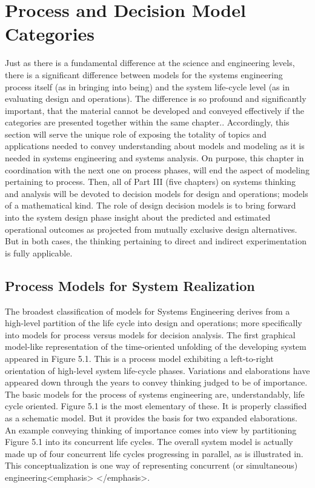 
\section{Process and Decision Model Categories}

Just as there is a fundamental difference at the science and engineering levels, there is a significant difference between models for the systems engineering process itself (as in bringing into being) and the system life-cycle level (as in evaluating design and operations). The difference is so profound and significantly important, that the material cannot be developed and conveyed effectively if the categories are presented together within the same chapter..
Accordingly, this section will serve the unique role of exposing the totality of topics and applications needed to convey understanding about models and modeling as it is needed in systems engineering and systems analysis. On purpose, this chapter in coordination with the next one on process phases, will end the aspect of modeling pertaining to process. Then, all of Part III (five chapters) on systems thinking and analysis will be devoted to decision models for design and operations; models of a mathematical kind. The role of design decision models is to bring forward into the system design phase insight about the predicted and estimated operational outcomes as projected from mutually exclusive design alternatives. But in both cases, the thinking pertaining to direct and indirect experimentation is fully applicable.

\subsection{Process Models for System Realization}

The broadest classification of models for Systems Engineering derives from a high-level partition of the life cycle into design and operations; more specifically into models for process versus models for decision analysis.
	The first graphical model-like representation of the time-oriented unfolding of the developing system appeared in Figure 5.1. This is a process model exhibiting a left-to-right orientation of high-level system life-cycle phases. Variations and elaborations have appeared down through the years to convey thinking judged to be of importance. 
The basic models for the process of systems engineering are, understandably, life cycle oriented. Figure 5.1 is the most elementary of these. It is properly classified as a schematic model. But it provides the basis for two expanded elaborations.
An example conveying thinking of importance comes into view by partitioning Figure 5.1 into its concurrent life cycles. The overall system model is actually made up of four concurrent life cycles progressing in parallel, as is illustrated in. This conceptualization is one way of representing concurrent (or simultaneous) engineering<emphasis> </emphasis>.

